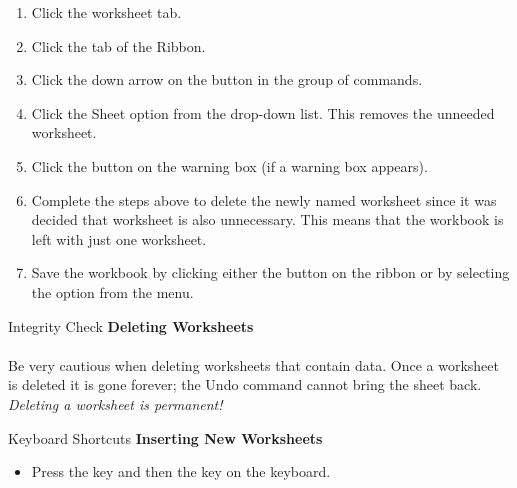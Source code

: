 \begin{enumerate}
	\item Click the  worksheet tab.
	\item Click the  tab of the Ribbon.
	\item Click the down arrow on the  button in the  group of commands.
	\item Click the  Sheet option from the drop-down list. This removes the unneeded worksheet.
	\item Click the  button on the  warning box (if a warning box appears).
	\item Complete the steps above to delete the newly named  worksheet since it was decided that worksheet is also unnecessary. This means that the workbook is left with just one worksheet.
	\item Save the workbook by clicking either the  button on the  ribbon or by selecting the  option from the  menu.
\end{enumerate}

\begin{center}
	\begin{infobox}{Integrity Check}
		\textbf{Deleting Worksheets}
		\\
		\\
		Be very cautious when deleting worksheets that contain data. Once a worksheet is deleted it is gone forever; the Undo command cannot bring the sheet back. \textit{Deleting a worksheet is permanent!}
	\end{infobox}
\end{center}

\begin{center}
	\begin{shtcutbox}{Keyboard Shortcuts}
		\textbf{Inserting New Worksheets}
		\\
		\begin{itemize}
			\setlength{\itemsep}{0pt}
			\setlength{\parskip}{0pt}
			\setlength{\parsep}{0pt}
			
			\item Press the  key and then the  key on the keyboard.
			
		\end{itemize}
	\end{shtcutbox}
\end{center}


